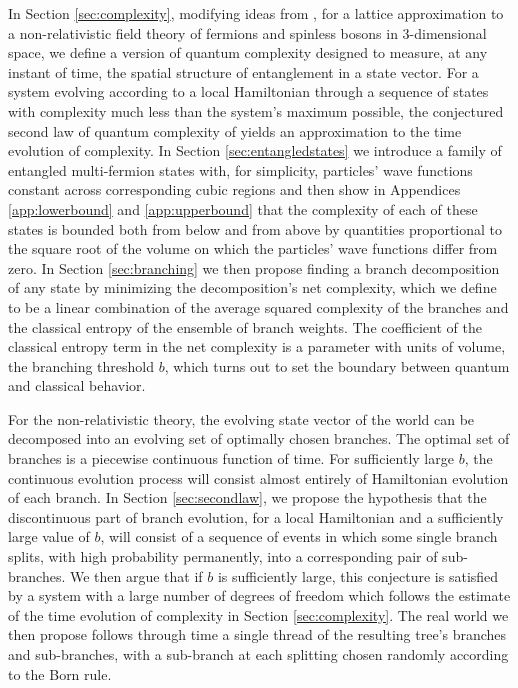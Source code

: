 \documentclass[12pt,amsmath,amssymb,onecolumn]{revtex4-2}
\begin{document}
In Section \ref{sec:complexity}, modifying ideas from \cite{Nielsen},
for a lattice approximation to a non-relativistic field theory of fermions and spinless bosons
in 3-dimensional space,
we define a version of quantum complexity
designed to measure, at any instant of time, the spatial structure of entanglement in a state vector.
For a system
evolving according to a local Hamiltonian through a sequence of states with complexity much less than
the system's maximum
possible, the conjectured second law of quantum complexity of \cite{Susskind}
yields an approximation to the
time evolution of complexity.
In Section \ref{sec:entangledstates} we 
introduce a family of entangled
multi-fermion states with, for simplicity, particles' wave functions constant across corresponding
cubic regions and then show in Appendices \ref{app:lowerbound} and \ref{app:upperbound}
that the complexity of each of these states 
is bounded both from below and from above by quantities 
proportional to the square root of the volume on which the particles'
wave functions differ from zero.
In Section \ref{sec:branching} we then propose finding a branch decomposition of any state by 
minimizing the decomposition's net complexity, which we define to be
a linear combination of the average squared complexity of the branches and the
classical entropy of the ensemble of branch weights. 
The coefficient of the classical entropy term in the net complexity is
a parameter with units of volume, the branching threshold $b$, which
turns out to
set the boundary between quantum and classical behavior.

For the non-relativistic theory, the evolving state vector of
the world can be decomposed into an evolving set of
optimally chosen branches.
The optimal set of branches is a piecewise continuous
function of time.
For sufficiently large $b$, the continuous evolution process will consist
almost entirely of Hamiltonian evolution of each branch.
In Section \ref{sec:secondlaw}, we propose the hypothesis that the
discontinuous part of branch evolution, for a
local Hamiltonian and a sufficiently large value of
$b$, 
will consist of
a sequence of events in which some single branch
splits, with high probability permanently, into
a corresponding pair of sub-branches.
We then argue that if $b$ is sufficiently large,
this conjecture is
satisfied by a system with a large number
of degrees of freedom which
follows the estimate of the time evolution of complexity
in Section \ref{sec:complexity}.
The real world we then propose
follows through time a single thread of the resulting
tree's branches and sub-branches,
with a sub-branch at each splitting chosen randomly
according to the Born rule.
\end{document}
